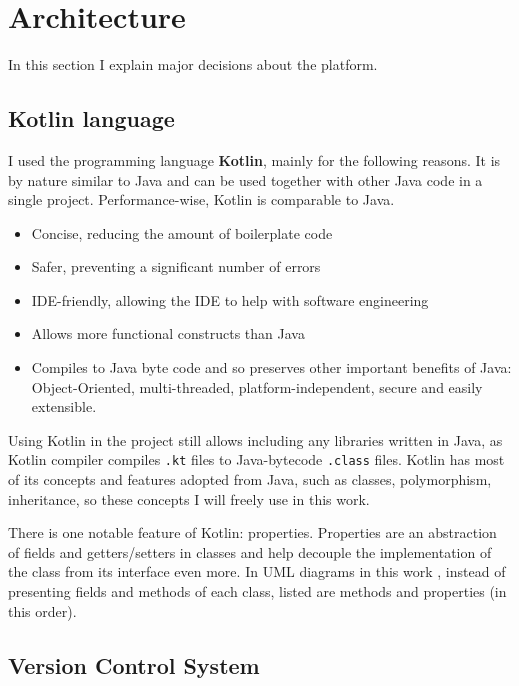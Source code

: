 \section{Architecture}

In this section I explain major decisions about the platform.



\subsection{Kotlin language}

I used the programming language \textbf{Kotlin}, mainly for the following reasons.
It is by nature similar to Java and can be used together with other Java code in a single project.
Performance-wise, Kotlin is comparable to Java.
\begin{itemize}
    \item Concise, reducing the amount of boilerplate code
    \item Safer, preventing a significant number of errors
    \item IDE-friendly, allowing the IDE to help with software engineering
    \item Allows more functional constructs than Java
    \item Compiles to Java byte code and so preserves other important benefits of Java: Object-Oriented, multi-threaded, platform-independent, secure and easily extensible.
\end{itemize}

Using Kotlin in the project still allows including any libraries written in Java, as Kotlin compiler compiles \texttt{.kt} files to Java-bytecode \texttt{.class} files.
Kotlin has most of its concepts and features adopted from Java, such as classes, polymorphism, inheritance, so these concepts I will freely use in this work.

There is one notable feature of Kotlin: properties.
Properties are an abstraction of fields and getters/setters in classes and help decouple the implementation of the class from its interface even more.
In UML diagrams in this work , instead of presenting fields and methods of each class, listed are methods and properties (in this order).


\subsection{Version Control System}

